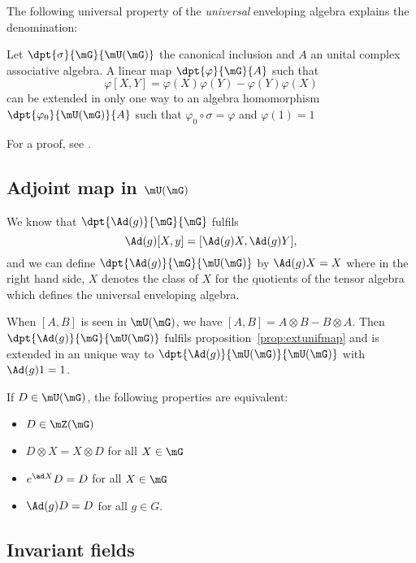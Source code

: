 The following universal property of the \emph{universal} enveloping algebra explains the denomination:
\begin{proposition}
	Let $\dpt{\sigma}{\mG}{\mU(\mG)}$ the canonical inclusion and $A$ an unital complex associative algebra. A linear map $\dpt{\varphi}{\mG}{A}$ such that
	\begin{equation}
		\varphi[X,Y]=\varphi(X)\varphi(Y)-\varphi(Y)\varphi(X)
	\end{equation}
	can be extended in only one way to an algebra homomorphism $\dpt{\varphi_0}{\mU(\mG)}{A}$ such that $\varphi_0\circ\sigma=\varphi$ and $\varphi(1)=1$
	\label{prop:extunifmap}
\end{proposition}
For a proof, see \cite{Knapp_reprez}.

\subsection{Adjoint map in \texorpdfstring{$\mU(\mG)$}{U(G)}}   \label{ssadjunif}

We know that $\dpt{ \Ad(g) }{ \mG }{ \mG }$ fulfils
\[
	\Ad(g)[X,y]=[  \Ad(g)X,\Ad(g)Y  ],
\]
and we can define $\dpt{ \Ad(g) }{ \mG }{ \mU(\mG) }$ by $\Ad(g)X=X$ where in the right hand side, $X$ denotes the class of $X$ for the quotients of the tensor algebra which defines the universal enveloping algebra.

When $[A,B]$ is seen in $\mU(\mG)$, we have $[A,B]=A\otimes B-B\otimes A$. Then $\dpt{ \Ad(g) }{ \mG }{ \mU(\mG) }$ fulfils proposition~\ref{prop:extunifmap} and is extended in an unique way to $\dpt{ \Ad(g) }{ \mU(\mG) }{ \mU(\mG) }$ with $\Ad(g)1=1$.

\begin{lemma}
	If $D\in\mU(\mG)$, the following properties are equivalent:
	\begin{itemize}
		\item $D\in\mZ(\mG)$
		\item $D\otimes X=X\otimes D$ for all $X\in \mG$
		\item $e^{\ad X}D=D$ for all $X\in\mG$
		\item $\Ad(g)D=D$ for all $g\in G$.
	\end{itemize}
	\label{lem:equivDAd}
\end{lemma}

\subsection{Invariant fields}

